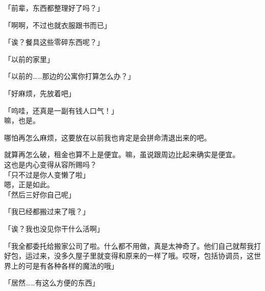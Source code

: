「前辈，东西都整理好了吗？」

「啊啊，不过也就衣服跟书而已」

「诶？餐具这些零碎东西呢？」

「以前的家里」

「以前的……那边的公寓你打算怎么办？」

「好麻烦，先放着吧」

「呜哇，还真是一副有钱人口气！」\\

嘛，也是。

哪怕再怎么麻烦，这要放在以前我也肯定是会拼命清退出来的吧。

就算再怎么破，租金也算不上是便宜。嘛，虽说跟周边比起来确实是便宜。\\

这也是内心变得从容所赐吗？\\

「只不过是你人变懒了啦」\\

嗯，正是如此。\\

「然后三好你自己呢」

「我已经都搬过来了哦？」

「诶？我也没见你干什么活啊」

「我全都委托给搬家公司了啦。什么都不用做，真是太神奇了。他们自己就帮我打好包，运过来，没多久屋子里就变得和原来的一样了哦。哎呀，包括协调员，这世界上的可是有各种各样的魔法的哦」

「居然……有这么方便的东西」\\


